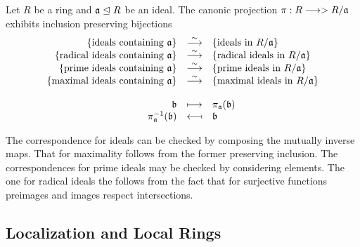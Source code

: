 	\begin{theorem}
		Let $R$ be a ring and $\mathfrak{a} \trianglelefteq R$ be an ideal. The canonic projection $\pi: R -->> R/\mathfrak{a}$ exhibits inclusion preserving bijections
		\begin{equation*}
			\begin{array}{rcl}
				\{\text{ideals containing }\ideal{a}\} &\overset{\sim}{\longrightarrow} &\{\text{ideals in } R/\ideal{a}\}\\
				\{\text{radical ideals containing }\ideal{a}\} &\overset{\sim}{\longrightarrow} &\{\text{radical ideals in } R/\ideal{a}\}\\
				\{\text{prime ideals containing }\ideal{a}\} &\overset{\sim}{\longrightarrow} &\{\text{prime ideals in } R/\ideal{a}\}\\
				\{\text{maximal ideals containing }\ideal{a}\} &\overset{\sim}{\longrightarrow} &\{\text{maximal ideals in } R/\ideal{a}\}\\\\
				\ideal{b} &\longmapsto &\pi_\ideal{a}(\ideal{b})\\
				\pi_\ideal{a}^{-1}(\ideal{b}) &\reflectbox{$\longmapsto$} &\ideal{b}
			\end{array}
		\end{equation*}
	\end{theorem}
	\begin{sketch}
		The correspondence for ideals can be checked by composing the mutually inverse maps. That for maximality follows from the former preserving inclusion. The correspondences for prime ideals may be checked by considering elements. The one for radical ideals the follows from the fact that for surjective functions preimages and images respect intersections. 
	\end{sketch}

	\newpage
	\subsection{Localization and Local Rings}

